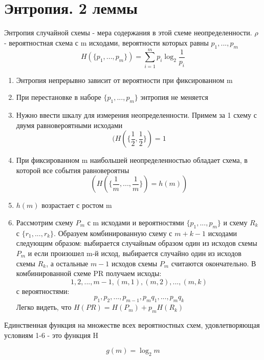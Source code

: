 \documentclass[discrete.tex]{subfiles}
\begin{document}
\section{Энтропия. 2 леммы}
\begin{definition}
  Энтропия случайной схемы - мера содержания в этой схеме неопределенности. $\rho$ - вероятностная схема с m исходами, вероятности которых равны $p_1,...,p_m$
  \[H(\{p_1,...,p_m\}) = \sum_{i=1}^m p_i \log_2 \frac{1}{p_i}\]
\end{definition}

\begin{properties}
  \begin{enumerate}
    \item Энтропия непрерывно зависит от вероятности при фиксированном m
    \item При перестановке в наборе $\{ p_1,...,p_m\}$ энтропия не меняется
    \item Нужно ввести шкалу для измерения неопределенности. Примем за 1 схему с двумя равновероятными исходами
    \[(H(\{\frac{1}{2},\frac{1}{2}\}) = 1\]
    \item При фиксированном m наибольшей неопределенностью обладает схема, в которой все события равновероятны
    \[(H(\{\frac{1}{m},...,\frac{1}{m}\}) = h(m))\]
    \item $h(m)$ возрастает с ростом m
    \item Рассмотрим схему $P_m$ с m исходами и вероятностями $\{p_1,...,p_m\}$ и схему $R_k$ с $\{r_1,...,r_k\}$. Образуем комбинированную схему с $m+k-1$ исходами следующим образом: выбирается случайным образом один из исходов схемы $P_m$ и если произошел m-й исход, выбирается случайно один из исходов схемы $R_k$, а остальные $m-1$ исходов схемы $P_m$ считаются окончательно. В комбинированной схеме PR получаем исходы:
    \[1,2,...,m-1,(m,1),(m,2),...,(m,k)\]
    с вероятностями:
    \[p_1,p_2,...,p_{m-1},p_m q_1,...,p_m q_k\]
    Легко видеть, что $H(PR)=H(P_m)+p_m H(R_k)$
  \end{enumerate}
\end{properties}

\begin{theorem}
  Единственная функция на множестве всех вероятностных схем, удовлетворяющая условиям 1-6 - это функция H
\end{theorem}

\begin{Lemma}[1]
  \[g(m) = \log_2 m\]
\end{Lemma}
\end{document}
